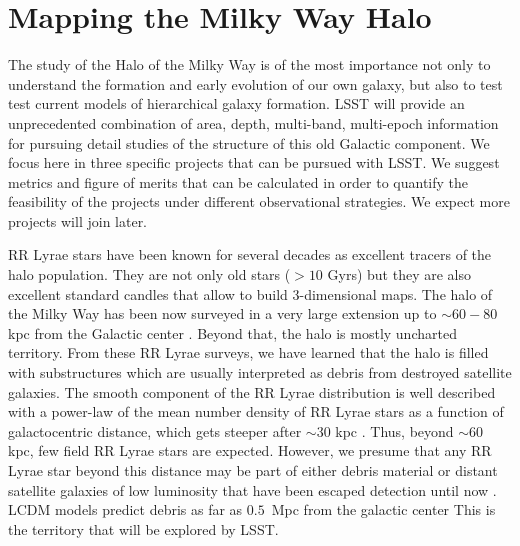 %
%
%
%
%
%
%

\section{Mapping the Milky Way Halo}
\def\secname{MW_Halo}\label{sec:\secname} %


The study of the Halo of the Milky Way is of the most importance not only to understand
the formation and early evolution of our own galaxy, but also to test 
test current models of hierarchical galaxy formation. 
LSST will provide an unprecedented combination of
area, depth, multi-band, multi-epoch information for pursuing detail studies
of the structure of this old Galactic component. We focus here in three
specific projects that can be pursued with LSST. We suggest metrics and figure of merits that can
be calculated in order to quantify the feasibility of the projects under different
observational strategies. We expect more projects will join later.

RR Lyrae stars have been known for several decades as excellent tracers
of the halo population. They are not only old stars ($>10$ Gyrs) but they are
also excellent standard candles that allow to build 3-dimensional maps. 
The halo of the Milky Way has been now surveyed in a very large extension up to 
$\sim 60-80$ kpc from the Galactic center \citep[][among others]{drake13a,drake13b,zinn14,torrealba15}. 
Beyond that, the halo is
mostly uncharted territory.
From these RR Lyrae surveys, we have learned that the halo is filled with substructures
which are usually interpreted as debris from destroyed satellite galaxies. The smooth 
component of the RR Lyrae distribution is well described
with a power-law of the mean number density of RR Lyrae stars as a function of
galactocentric distance, which gets steeper after $\sim 30$ kpc \citep{zinn14}. 
Thus, beyond $\sim 60$ kpc, few field RR Lyrae stars are expected. However, we presume that 
any RR Lyrae star beyond this distance may be part of either debris material or distant
satellite galaxies of low luminosity that have been escaped detection until now \citep{sesar14,baker15}. 
LCDM models predict debris as far as $0.5$~Mpc from the galactic center
This is the territory that will be explored by LSST.

